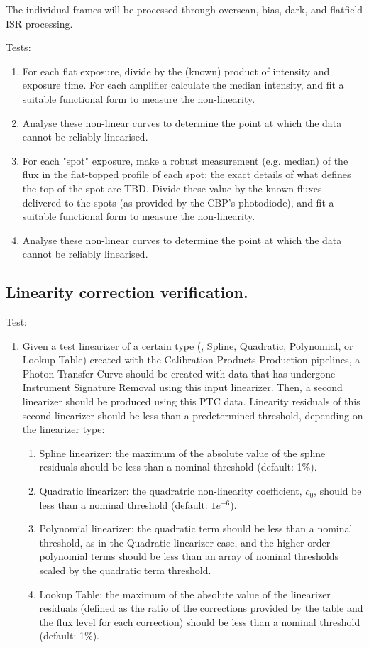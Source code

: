 \documentclass[DM,authoryear,toc,lsstdraft]{lsstdoc}
\begin{document}
The individual frames will be processed through overscan, bias, dark, and flatfield ISR processing.

Tests:
\begin{enumerate}
\item For each flat exposure, divide by the (known) product of intensity and exposure time.
For each amplifier calculate the median intensity, and fit a suitable functional form
to measure the non-linearity.
\item Analyse these non-linear curves to determine the point at which the data cannot be reliably
linearised.
\item For each "spot" exposure, make a robust measurement (e.g. median) of the flux in the flat-topped profile of
each spot; the exact details of what defines the top of the spot are TBD.  Divide these value by the known
fluxes delivered to the spots (as provided by the CBP's photodiode), and fit a suitable functional form to
measure the non-linearity.
\item Analyse these non-linear curves to determine the point at which the data cannot be reliably
linearised.
\end{enumerate}


\subsection{Linearity correction verification.}

Test:
\begin{enumerate}
	\item Given a test linearizer of a certain type (, Spline, Quadratic, Polynomial, or Lookup Table) created with the Calibration Products Production pipelines, a Photon Transfer Curve should be created with data that has undergone Instrument Signature Removal using this input linearizer. Then, a second linearizer should be produced using this PTC data. Linearity residuals of this second linearizer should be less than a predetermined threshold, depending on the linearizer type:
		\begin{enumerate}
			\item Spline linearizer: the maximum of the absolute value of the spline residuals should be less than a nominal threshold (default: 1\%).
			\item Quadratic linearizer: the quadratric non-linearity coefficient, $c_0$, should be less than a nominal threshold (default: $1e^{-6}$).
			\item Polynomial linearizer: the quadratic term should be less than a nominal threshold, as in the Quadratic linearizer case, and the higher order polynomial terms should be less than an array of nominal thresholds scaled by the quadratic term threshold.
			\item Lookup Table: the maximum of the absolute value of the linearizer residuals (defined as the ratio of the corrections provided by the table and the flux level for each correction) should be less than a nominal threshold (default: 1\%).
		\end{enumerate}
 
\end{enumerate}
\end{document}
